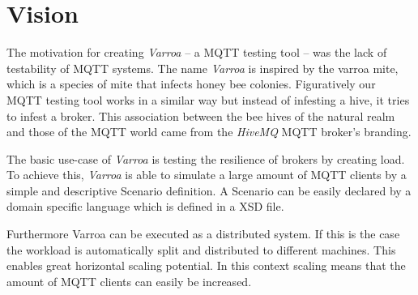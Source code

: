 \chapter{Vision}
The motivation for creating \emph{Varroa} -- a MQTT testing tool -- was the lack of testability of MQTT systems.
The name \emph{Varroa} is inspired by the varroa mite, which is a species of mite that infects honey bee colonies.
Figuratively our MQTT testing tool works in a similar way but instead of infesting a hive, it tries to infest a broker.
This association between the bee hives of the natural realm and those of the MQTT world came from the \emph{HiveMQ} MQTT broker's branding.


The basic use-case of \emph{Varroa} is testing the resilience of brokers by creating load.
To achieve this, \emph{Varroa} is able to simulate a large amount of MQTT clients by a simple and descriptive Scenario definition.
A Scenario can be easily declared by a domain specific language which is defined in a XSD file.


Furthermore Varroa can be executed as a distributed system.
If this is the case the workload is automatically split and distributed to different machines.
This enables great horizontal scaling potential.
In this context scaling means that the amount of MQTT clients can easily be increased.


